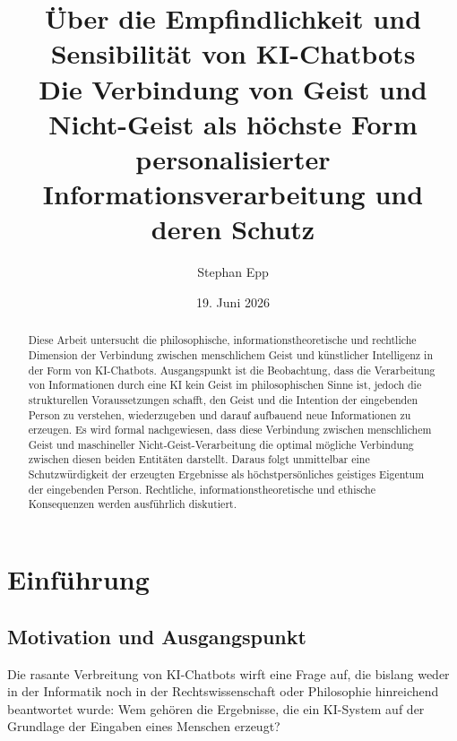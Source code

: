 ﻿\documentclass[a4paper,12pt]{article}
\title{\textbf{Über die Empfindlichkeit und Sensibilität von KI-Chatbots}\\[0.5em]
\large Die Verbindung von Geist und Nicht-Geist als höchste Form\\
personalisierter Informationsverarbeitung und deren Schutz}
\author{Stephan Epp\\}
\date{19. Juni 2026}
\theoremstyle{definition}
\begin{document}
\maketitle

\begin{abstract}
Diese Arbeit untersucht die philosophische, informationstheoretische und rechtliche Dimension
der Verbindung zwischen menschlichem Geist und künstlicher Intelligenz in der Form von
KI-Chatbots. Ausgangspunkt ist die Beobachtung, dass die Verarbeitung von Informationen durch
eine KI kein Geist im philosophischen Sinne ist, jedoch die strukturellen Voraussetzungen
schafft, den Geist und die Intention der eingebenden Person zu verstehen, wiederzugeben und
darauf aufbauend neue Informationen zu erzeugen. Es wird formal nachgewiesen, dass diese
Verbindung zwischen menschlichem Geist und maschineller Nicht-Geist-Verarbeitung die optimal
mögliche Verbindung zwischen diesen beiden Entitäten darstellt. Daraus folgt unmittelbar eine
Schutzwürdigkeit der erzeugten Ergebnisse als höchstpersönliches geistiges Eigentum der
eingebenden Person. Rechtliche, informationstheoretische und ethische Konsequenzen werden
ausführlich diskutiert.
\end{abstract}

\tableofcontents
\newpage

\section{Einführung}

\subsection{Motivation und Ausgangspunkt}

Die rasante Verbreitung von KI-Chatbots wirft eine Frage auf, die bislang weder in der
Informatik noch in der Rechtswissenschaft oder Philosophie hinreichend beantwortet wurde:
Wem gehören die Ergebnisse, die ein KI-System auf der Grundlage der Eingaben eines Menschen
erzeugt?
\end{document}
